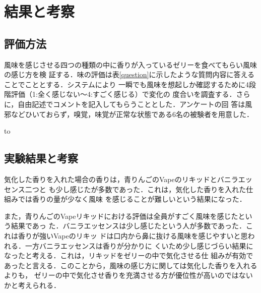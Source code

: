 \section{結果と考察}

\subsection{評価方法}

風味を感じさせる四つの種類の中に香りが入っているゼリーを食べてもらい風味の感じ方を検
証する．味の評価は表\ref{question}に示したような質問内容に答えることでこととする．システムにより
一瞬でも風味を想起しか確認するために4段階評価（1:全く感じない～4:すごく感じる）で変化の
度合いを調査する．さらに，自由記述でコメントを記入してもらうこととした．アンケートの回
答は風邪などひいておらず，嗅覚，味覚が正常な状態である6名の被験者を用意した．


\begin{table}[t]
    \caption{質問内容}
    \label{question}
    \hbox to
    \end{table}


\subsection{実験結果と考察}

気化した香りを入れた場合の香りは，青りんごのVapeのリキッドとバニラエッセンス二つと
も少し感じたが多数であった．これは，気化した香りを入れた仕組みでは香りの量が少なく風味
を感じることが難しいという結果になった．


また，青りんごのVapeリキッドにおける評価は全員がすごく風味を感じたという結果であっ
た．バニラエッセンスは少し感じたという人が多数であった．これは香りが強いVapeのリキッ
ドは口内から鼻に抜ける風味を感じやすいと思われる．一方バニラエッセンスは香りが分かりに
くいため少し感じづらい結果になったと考える．これは，リキッドをゼリーの中で気化させる仕
組みが有効であったと言える．このことから，風味の感じ方に関しては気化した香りを入れるよりも，
ゼリーの中で気化させ香りを充満させる方が優位性が高いのではないかと考えられる．


